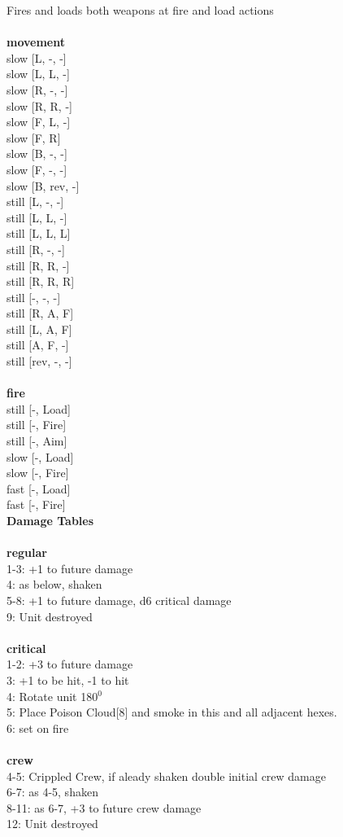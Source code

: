 \noindent Fires and loads both weapons at fire and load actions\\ 


\ \\ {\bf movement } \\
slow [L, -, -] \\
slow [L, L, -] \\
slow [R, -, -] \\
slow [R, R, -] \\
slow [F, L, -] \\
slow [F, R] \\
slow [B, -, -] \\
slow [F, -, -] \\
slow [B, rev, -] \\
still [L, -, -] \\
still [L, L, -] \\
still [L, L, L] \\
still [R, -, -] \\
still [R, R, -] \\
still [R, R, R] \\
still [-, -, -] \\
still [R, A, F] \\
still [L, A, F] \\
still [A, F, -] \\
still [rev, -, -] \\
\ \\ {\bf fire } \\
still [-, Load] \\
still [-, Fire] \\
still [-, Aim] \\
slow [-, Load] \\
slow [-, Fire] \\
fast [-, Load] \\
fast [-, Fire] \\


{\bf Damage Tables} \\
\ \\ {\bf regular } \\
1-3: +1 to future damage \\
4: as below, shaken \\
5-8: +1 to future damage, d6 critical damage \\
9: Unit destroyed \\
\ \\ {\bf critical } \\
1-2: +3 to future damage \\
3: +1 to be hit, -1 to hit \\
4: Rotate unit 180$^0$ \\
5: Place Poison Cloud[8] and smoke in this and all adjacent hexes. \\
6: set on fire \\
\ \\ {\bf crew } \\
4-5: Crippled Crew, if aleady shaken double initial crew damage \\
6-7: as 4-5, shaken \\
8-11: as 6-7, +3 to future crew damage \\
12: Unit destroyed \\


